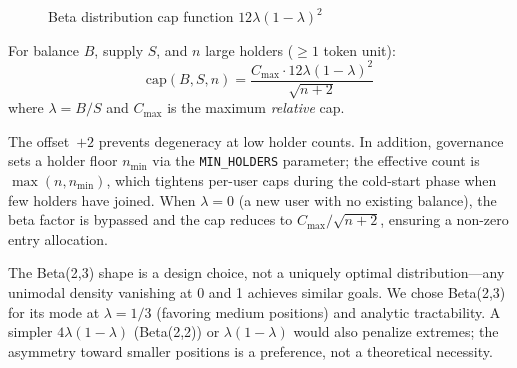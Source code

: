 \documentclass[10pt,a4paper,twocolumn]{article}
\begin{document}
\begin{figure}[htbp]
\centering
{}
\caption{Beta distribution cap function \mbox{$12\lambda(1{-}\lambda)^2$}}
\label{fig:beta-distribution}
\end{figure}

\begin{definition}
\label{def:cap}
For balance $B$, supply $S$, and $n$ large holders ($\geq 1$ token unit):
\begin{equation}
\label{eq:beta-cap}
\text{cap}(B, S, n) = \frac{C_{\max} \cdot 12\lambda(1{-}\lambda)^2}{\sqrt{n + 2}}
\end{equation}
where $\lambda = B/S$ and $C_{\max}$ is the maximum \emph{relative} cap.
\end{definition}

The offset~$+2$ prevents degeneracy at low holder counts. In addition, governance sets a holder floor $n_{\min}$ via the \texttt{MIN\_HOLDERS} parameter; the effective count is $\max(n, n_{\min})$, which tightens per-user caps during the cold-start phase when few holders have joined. When $\lambda = 0$ (a new user with no existing balance), the beta factor is bypassed and the cap reduces to $C_{\max}/\sqrt{n{+}2}$, ensuring a non-zero entry allocation.

The Beta(2,3) shape is a design choice, not a uniquely optimal distribution---any unimodal density vanishing at 0 and 1 achieves similar goals. We chose Beta(2,3) for its mode at $\lambda = 1/3$ (favoring medium positions) and analytic tractability. A simpler $4\lambda(1{-}\lambda)$ (Beta(2,2)) or $\lambda(1{-}\lambda)$ would also penalize extremes; the asymmetry toward smaller positions is a preference, not a theoretical necessity.
\end{document}
